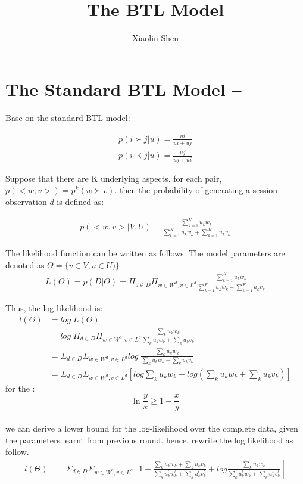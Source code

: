 \documentclass{article}
\title{The BTL Model}
\author{Xiaolin Shen}
\begin{document}
\maketitle


\section{The Standard BTL Model --}
Base on the standard BTL model:

\begin{align*}
	p(i \succ j |u)=\frac{ui}{ui+ uj} \\
	p(i \prec j |u)=\frac{uj}{uj+ ui}
\end{align*}

 Suppose that there are K underlying aspects. for each pair, $p(<w,v>) = p^k(w\succ v) $. then the probability of generating a session observation $d$ is defined as:

\begin{align}
p(<w,v>|V,U)
= \frac{\sum_{k=1}^{K} u_k w_k}{\sum_{k=1}^{K} u_k w_k+ \sum_{k=1}^{K} u_k v_k}
\end{align}

The likelihood function can be written as follows. The model parameters are denoted as $ \Theta = \{ v \in V ,u \in U ) \}$
\begin{align}
L(\Theta)=p(D|\Theta)
=\Pi_{d \in D} \Pi_{w\in W^d, v\in L^d} \frac{\sum_{k=1}^{K} u_k w_k}{\sum_{k=1}^{K} u_k w_k+ \sum_{k=1}^{K} u_k v_k}
\end{align}

Thus, the log likelihood is:
\begin{align}
l(\Theta) &= log \; L(\Theta) \\
& =log \; \Pi_{d \in D} \Pi_{w\in W^d, v\in L^d} \frac{\sum_k u_k w_k}{\sum_k u_k w_k+ \sum_k u_k v_k}\\ \nonumber
& =\Sigma_{d \in D} \Sigma_{w\in W^d, v\in L^d} log \;  \frac{\sum_k u_k w_k}{\sum_k u_k w_k+ \sum_k u_k v_k}\\ \nonumber
& =\Sigma_{d \in D} \Sigma_{w\in W^d, v\in L^d} [log \sum_k u_k w_k-log (\sum_k u_k w_k+ \sum_k u_k v_k)]
\end{align}
for the :
\begin{equation*}
\ln \frac{y}{x} \geq 1- \frac{x}{y}
\end{equation*}\\
we can derive a lower bound for the log-likelihood over the complete data, given the parameters learnt from previous round.
hence, rewrite the log likelihood as follow.
\begin{align}
l(\Theta) 
& =\Sigma_{d \in D} \Sigma_{w\in W^d, v\in L^d} [1- \frac{\sum_k u_k w_k+ \sum_k u_k v_k}{\sum_k u_k^t w_k^t + \sum_k u_k^t v_k^t} + log \frac{\sum_k u_k w_k}{\sum_k u_k^t w_k^t + \sum_k u_k^t v_k^t}]
\end{align}
\end{document}
